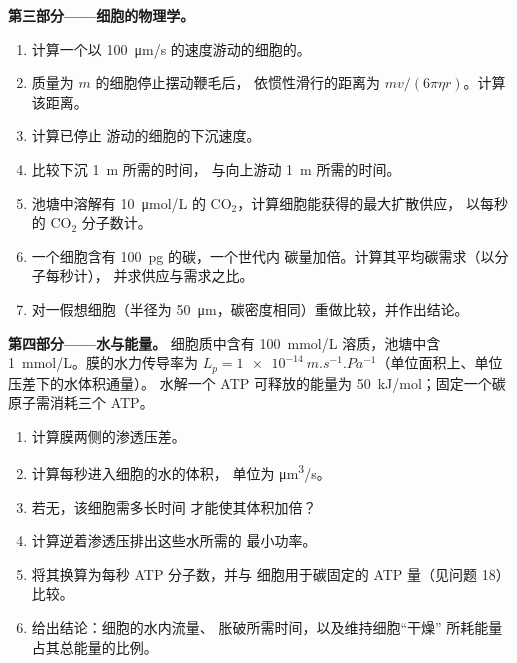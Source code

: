 \begin{problem}
\medskip
\noindent\textbf{第三部分——细胞的物理学。}
\begin{enumerate}[resume]
  \item 计算一个以
        \qty{100}{\micro m/s} 的速度游动的细胞的。
  \item 质量为 $m$ 的细胞停止摆动鞭毛后，
        依惯性滑行的距离为 $mv/(6\pi\eta r)$。计算该距离。
  \item 计算已停止
        游动的细胞的下沉速度。
  \item 比较下沉 \qty{1}{m} 所需的时间，
        与向上游动 \qty{1}{m} 所需的时间。
  \item 池塘中溶解有 \qty{10}{\micro mol/L}
        的 $\mathrm{CO_2}$，计算细胞能获得的最大扩散供应，
        以每秒的 $\mathrm{CO_2}$ 分子数计。
  \item 一个细胞含有 \qty{100}{pg} 的碳，一个世代内
        碳量加倍。计算其平均碳需求（以分子每秒计），
        并求供应与需求之比。
  \item 对一假想细胞（半径为
        \qty{50}{\micro m}，碳密度相同）重做比较，并作出结论。
\end{enumerate}

\medskip
\noindent\textbf{第四部分——水与能量。}
细胞质中含有 \qty{100}{mmol/L} 溶质，池塘中含
\qty{1}{mmol/L}。膜的水力传导率为 $L_p =
\qty{1e-14}{m.s^{-1}.Pa^{-1}}$（单位面积上、单位压差下的水体积通量）。
水解一个 ATP 可释放的能量为
\qty{50}{kJ/mol}；固定一个碳原子需消耗三个 ATP。
\begin{enumerate}[resume]
  \item 计算膜两侧的渗透压差。
  \item 计算每秒进入细胞的水的体积，
        单位为 \unit{\micro m^3/s}。
  \item 若无，该细胞需多长时间
        才能使其体积加倍？
  \item 计算逆着渗透压排出这些水所需的
        最小功率。
  \item 将其换算为每秒 ATP 分子数，并与
        细胞用于碳固定的 ATP 量（见问题 18）比较。
  \item 给出结论：细胞的水内流量、
        胀破所需时间，以及维持细胞“干燥”
        所耗能量占其总能量的比例。
\end{enumerate}
\end{problem}
